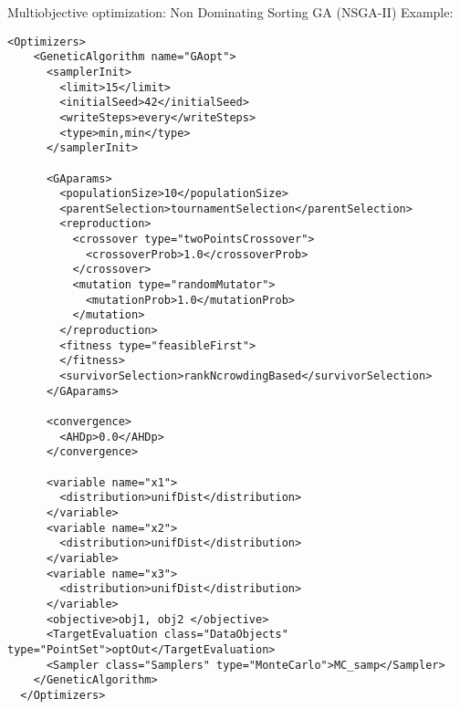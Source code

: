 \hspace{24pt}
Multiobjective optimization: Non Dominating Sorting GA (NSGA-II) Example:
\begin{lstlisting}[style=XML]
  <Optimizers>
    <GeneticAlgorithm name="GAopt">
      <samplerInit>
        <limit>15</limit>
        <initialSeed>42</initialSeed>
        <writeSteps>every</writeSteps>
        <type>min,min</type>
      </samplerInit>

      <GAparams>
        <populationSize>10</populationSize>
        <parentSelection>tournamentSelection</parentSelection>
        <reproduction>
          <crossover type="twoPointsCrossover">
            <crossoverProb>1.0</crossoverProb>
          </crossover>
          <mutation type="randomMutator">
            <mutationProb>1.0</mutationProb>
          </mutation>
        </reproduction>
        <fitness type="feasibleFirst">
        </fitness>
        <survivorSelection>rankNcrowdingBased</survivorSelection>
      </GAparams>

      <convergence>
        <AHDp>0.0</AHDp>
      </convergence>

      <variable name="x1">
        <distribution>unifDist</distribution>
      </variable>
      <variable name="x2">
        <distribution>unifDist</distribution>
      </variable>
      <variable name="x3">
        <distribution>unifDist</distribution>
      </variable>
      <objective>obj1, obj2 </objective>
      <TargetEvaluation class="DataObjects" type="PointSet">optOut</TargetEvaluation>
      <Sampler class="Samplers" type="MonteCarlo">MC_samp</Sampler>
    </GeneticAlgorithm>
  </Optimizers>
\end{lstlisting}


